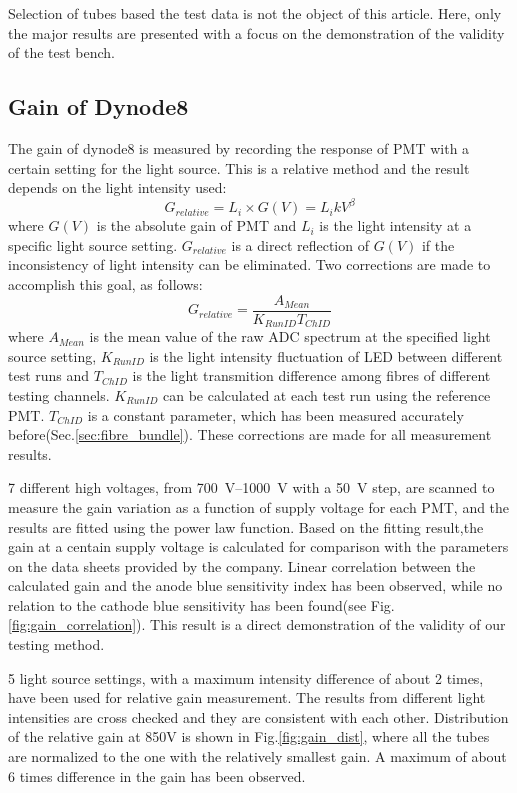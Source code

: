 \documentclass[5p, times]{elsarticle}
\begin{document}
Selection of tubes based the test data is not the object of this article.
Here, only the major results are presented with a focus on the demonstration of the validity of the test bench. 

\subsection{Gain of Dynode8}
\label{sec:psd_gain}

The gain of dynode8 is measured by recording the response of PMT with a certain setting for the light source. 
This is a relative method and the result depends on the light intensity used:
\begin{equation}
 G_{relative} = L_i \times G(V) = L_i k V^\beta
\end{equation}
where $G(V)$ is the absolute gain of PMT and $L_i$ is the light intensity at a specific light source setting.
$G_{relative}$ is a direct reflection of $G(V)$ if the inconsistency of light intensity can be eliminated.
Two corrections are made to accomplish this goal, as follows: 
\begin{equation}
 G_{relative} = \frac{A_{Mean}}{K_{RunID} T_{ChID}}
\end{equation} 
where $A_{Mean}$ is the mean value of the raw ADC spectrum at the specified light source setting,
$K_{RunID}$ is the light intensity fluctuation of LED between different test runs and $T_{ChID}$ is the light transmition difference among fibres of different testing channels.
$K_{RunID}$ can be calculated at each test run using the reference PMT.
$T_{ChID}$ is a constant parameter, which has been measured accurately before(Sec.\ref{sec:fibre_bundle}).
These corrections are made for all measurement results.

7 different high voltages, from \SIrange{700}{1000}{\volt} with a \SI{50}{\volt} step, are scanned to measure the gain variation as a function of supply voltage for each PMT, and the results are fitted using the power law function.
Based on the fitting result,the gain at a centain supply voltage is calculated for comparison with the parameters on the data sheets provided by the company.
Linear correlation between the calculated gain and the anode blue sensitivity index has been observed, while no relation to the cathode blue sensitivity has been found(see Fig.\ref{fig:gain_correlation}).
This result is a direct demonstration of the validity of our testing method.

5 light source settings, with a maximum intensity difference of about 2 times, have been used for relative gain measurement.
The results from different light intensities are cross checked and they are consistent with each other.
Distribution of the relative gain at 850V is shown in Fig.\ref{fig:gain_dist}, where all the tubes are normalized to the one with the relatively smallest gain. 
A maximum of about 6 times difference in the gain has been observed.
\end{document}

